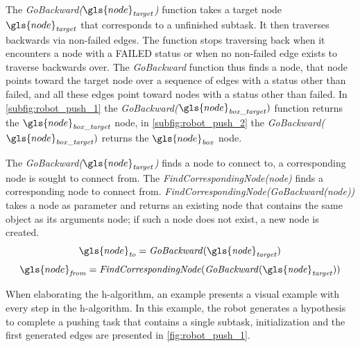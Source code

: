 The \textit{GoBackward($\gls{node}_\mathit{target}$)} function takes a target node $\gls{node}_\mathit{target}$ that corresponds to a unfinished subtask. It then traverses backwards via non-failed edges. The function stops traversing back when it encounters a node with a FAILED status or when no non-failed edge exists to traverse backwards over. The \textit{GoBackward} function thus finds a node, that node points toward the target node over a sequence of edges with a status other than failed, and all these edges point toward nodes with a status other than failed. In \cref{subfig:robot_push_1} the \textit{GoBackward($\gls{node}_\mathit{box\_target})$} function returns the $\gls{node}_\mathit{box\_target}$ node, in \cref{subfig:robot_push_2} the \textit{GoBackward($\gls{node}_\mathit{box\_target})$} returns the $\gls{node}_\mathit{box}$ node.\bs

The \textit{GoBackward($\gls{node}_\mathit{target}$)} finds a node to connect to, a corresponding node is sought to connect from. The \textit{FindCorrespondingNode(\gls{node})} finds a corresponding node to connect from. \textit{FindCorrespondingNode(GoBackward(\gls{node}))} takes a node as parameter and returns an existing node that contains the same object as its arguments node; if such a node does not exist, a new node is created.
\[\gls{node}_\mathit{to} =  \mathit{GoBackward(\gls{node}_\mathit{target})}\]
\[\gls{node}_\mathit{from} = \mathit{FindCorrespondingNode(GoBackward(\gls{node}_\mathit{target}))}\]

When elaborating the \ac{h-algorithm}, an example presents a visual example with every step in the \ac{h-algorithm}. In this example, the robot generates a hypothesis to complete a pushing task that contains a single subtask, initialization and the first generated edges are presented in \cref{fig:robot_push_1}.\bs

